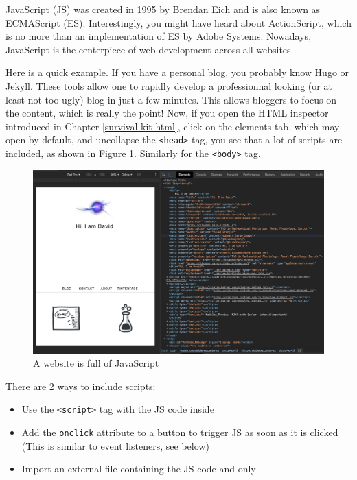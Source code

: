 \documentclass[]{book}
\providecommand{\tightlist}{%
  \setlength{\itemsep}{0pt}\setlength{\parskip}{0pt}}
\begin{document}
JavaScript (JS) was created in 1995 by Brendan Eich and is also known as ECMAScript (ES). Interestingly, you might have heard about ActionScript, which is no more than an implementation of ES by Adobe Systems. Nowadays, JavaScript is the centerpiece of web development across all websites.

Here is a quick example. If you have a personal blog, you probably know Hugo or Jekyll. These tools allow one to rapidly develop a professionnal looking (or at least not too ugly) blog in just a few minutes. This allows bloggers to focus on the content, which is really the point! Now, if you open the HTML inspector introduced in Chapter \ref{survival-kit-html}, click on the elements tab, which may open by default, and uncollapse the \texttt{\textless{}head\textgreater{}} tag, you see that a lot of scripts are included, as shown in Figure \ref{fig:scripts-list}. Similarly for the \texttt{\textless{}body\textgreater{}} tag.

\begin{figure}
\includegraphics[width=34.86in]{images/survival-kit/scripts-list} \caption{A website is full of JavaScript}\label{fig:scripts-list}
\end{figure}

There are 2 ways to include scripts:

\begin{itemize}
\tightlist
\item
  Use the \texttt{\textless{}script\textgreater{}} tag with the JS code inside
\item
  Add the \texttt{onclick} attribute to a button to trigger JS as soon as it is clicked (This is similar to event listeners, see below)
\item
  Import an external file containing the JS code and only
\end{itemize}
\end{document}
